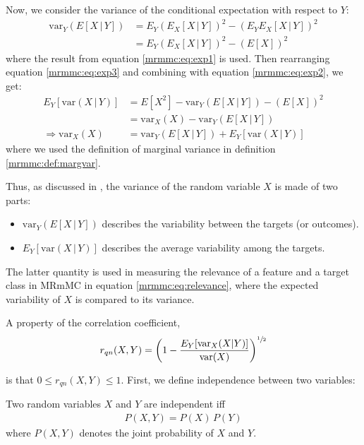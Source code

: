 \documentclass[12pt, twoside, a4paper]{report}
\def\var{\text{var}}
\begin{document}
Now, we consider the variance of the conditional expectation with respect to $Y$:
\begin{align}
\var_Y (E[X \, | \, Y]) &= E_Y \left( E_X[X \, | \, Y]\right)^2 - \left( E_YE_X[X \, | \, Y] \right)^2 \\
&= E_Y \left( E_X[X \, | \, Y]\right)^2 - \left( E[X] \right)^2 \label{mrmmc:eq:exp3}
\end{align}
where the result from equation \ref{mrmmc:eq:exp1} is used. Then rearranging equation \ref{mrmmc:eq:exp3} and combining with equation \ref{mrmmc:eq:exp2}, we get:
\begin{align*}
E_Y [ \var(X \, | \, Y) ] &= E[X^2] - \var_Y (E[X \, | \, Y]) - \left( E[X] \right)^2 \\
&= \var_X(X) - \var_Y (E[X \, | \, Y]) \\
\Rightarrow \var_X(X) &= \var_Y (E[X \, | \, Y]) + E_Y [ \var(X \, | \, Y) ]
\end{align*}
where we used the definition of marginal variance in definition \ref{mrmmc:def:margvar}.

Thus, as discussed in \cite{RefWorks:187}, the variance of the random variable $X$ is made of two parts: 
\begin{itemize}
  \item $\var_Y (E[X \, | \, Y])$ describes the variability between the targets (or outcomes).
  \item $E_Y [ \var(X \, | \, Y) ]$ describes the average variability among the targets.
\end{itemize}

The latter quantity is used in measuring the relevance of a feature and a target class in MRmMC in equation \ref{mrmmc:eq:relevance}, where the expected variability of $X$ is compared to its variance.

A property of the correlation coefficient,
\begin{align*}
r_{qn}(X, Y) = \left( 1 - \frac{E_Y[\var_X(X|Y)]}{\var(X)} \right)^{\sfrac{1}{2}}
\end{align*}

is that $0 \leq r_{qn}(X, Y) \leq 1$. First, we define independence between two variables:

\begin{mydef}
Two random variables $X$ and $Y$ are independent iff
\begin{align}
P(X, Y) = P(X) \, P(Y) \label{mrmmc:eq:indep}
\end{align}
where $P(X, Y)$ denotes the joint probability of $X$ and $Y$.
\end{mydef}
\end{document}
